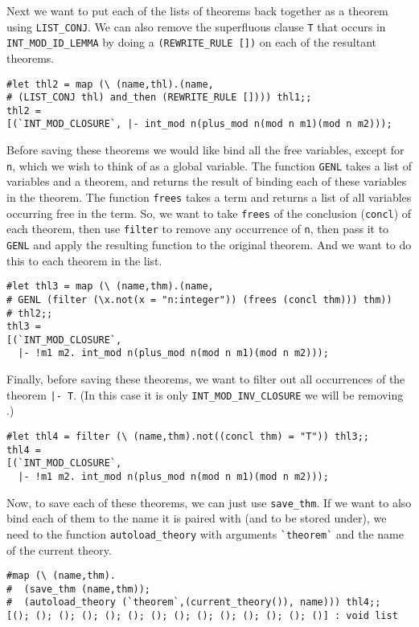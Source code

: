 Next we want to put each of the lists of theorems back together as a
theorem using {\small\verb+LIST_CONJ+}.  We can also remove the superfluous
clause {\small\tt T} that occurs in {\small\verb+INT_MOD_ID_LEMMA+} by doing a
{\small\verb+(REWRITE_RULE [])+} on each of the resultant theorems.
\begin{session}
\begin{verbatim}
#let thl2 = map (\ (name,thl).(name,
# (LIST_CONJ thl) and_then (REWRITE_RULE []))) thl1;;
thl2 = 
[(`INT_MOD_CLOSURE`, |- int_mod n(plus_mod n(mod n m1)(mod n m2)));
\end{verbatim}
\evdots
\end{session}

Before saving these theorems we would like bind all the free variables, 
except for {\small\tt n}, which we wish to think of as a global variable.
The function {\small\verb+GENL+} takes a list of variables and a theorem,
and returns the result of binding each of these variables in the theorem.
The function {\small\verb+frees+} takes a term and returns a list of all
variables occurring free in the term.  So, we want to take
{\small\verb+frees+} of the conclusion ({\small\verb+concl+}) of each
theorem, then use {\small\verb+filter+} to remove any occurrence of
{\small\tt n}, then pass it to {\small\verb+GENL+} and apply the resulting
function to the original theorem.  And we want to  do this to each theorem
in the list. 
\begin{session}
\begin{verbatim}
#let thl3 = map (\ (name,thm).(name,
# GENL (filter (\x.not(x = "n:integer")) (frees (concl thm))) thm))
# thl2;;
thl3 = 
[(`INT_MOD_CLOSURE`,
  |- !m1 m2. int_mod n(plus_mod n(mod n m1)(mod n m2)));
\end{verbatim}
\evdots
\end{session}

Finally, before saving these theorems, we want to filter out all
occurrences of the theorem {\small\verb+|- T+}.  (In this case it is only
{\small\verb+INT_MOD_INV_CLOSURE+} we will be removing .)
\begin{session}
\begin{verbatim}
#let thl4 = filter (\ (name,thm).not((concl thm) = "T")) thl3;;
thl4 = 
[(`INT_MOD_CLOSURE`,
  |- !m1 m2. int_mod n(plus_mod n(mod n m1)(mod n m2)));
\end{verbatim}
\evdots
\end{session}

Now, to save each of these theorems, we can just use {\small\verb+save_thm+}.
If we want to also bind each of them to the name it is paired with
(and to be stored under), we need to the function
{\small\verb+autoload_theory+} with arguments {\small\verb+`theorem`+} and the
name of the current theory.
\begin{session}
\begin{verbatim}
#map (\ (name,thm).
#  (save_thm (name,thm));
#  (autoload_theory (`theorem`,(current_theory()), name))) thl4;;
[(); (); (); (); (); (); (); (); (); (); (); (); (); ()] : void list
\end{verbatim}
\end{session}

